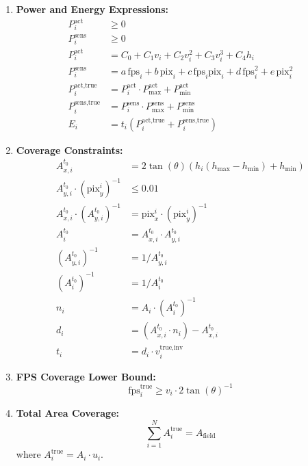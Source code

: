\begin{enumerate}
    \item \textbf{Power and Energy Expressions:}
    \begin{align}
        P^{\text{act}}_i &\geq 0 \\
        P^{\text{sens}}_i &\geq 0 \\
        P^{\text{act}}_i &= C_0 + C_1 v_i + C_2 v_i^2 + C_3 v_i^3 + C_4 h_i \\
        P^{\text{sens}}_i &= a\,\text{fps}_i + b\,\text{pix}_i + c\,\text{fps}_i \text{pix}_i + d\,\text{fps}_i^2 + e\,\text{pix}_i^2 \\
        P^{\text{act,true}}_i &= P^{\text{act}}_i \cdot P^{\text{act}}_{\max} + P^{\text{act}}_{\min} \\
        P^{\text{sens,true}}_i &= P^{\text{sens}}_i \cdot P^{\text{sens}}_{\max} + P^{\text{sens}}_{\min} \\
        E_i &= t_i (P^{\text{act,true}}_i + P^{\text{sens,true}}_i)
    \end{align}

    \item \textbf{Coverage Constraints:}
    \begin{align}
        A_{x,i}^{t_0} &= 2 \tan(\theta) (h_i (h_{\max} - h_{\min}) + h_{\min}) \\
        A_{y,i}^{t_0} \cdot (\text{pix}_y^i)^{-1} &\leq 0.01 \\
        A_{x,i}^{t_0} \cdot (A_{y,i}^{t_0})^{-1} &= \text{pix}_x^i \cdot (\text{pix}_y^i)^{-1} \\
        A_{i}^{t_0} &= A_{x,i}^{t_0} \cdot A_{y,i}^{t_0} \\
        (A_{y,i}^{t_0})^{-1} &= 1 / A_{y,i}^{t_0} \\
        (A_{i}^{t_0})^{-1} &= 1 / A_{i}^{t_0} \\
        n_i &= A_i \cdot (A_{i}^{t_0})^{-1} \\
        d_i &= (A_{x,i}^{t_0} \cdot n_i) - A_{x,i}^{t_0} \\
        t_i &= d_i \cdot v_i^{\text{true,inv}}
    \end{align}

    \item \textbf{FPS Coverage Lower Bound:}
    \begin{equation}
        \text{fps}_i^{\text{true}} \geq v_i \cdot 2 \tan(\theta)^{-1}
    \end{equation}

    \item \textbf{Total Area Coverage:}
    \begin{equation}
        \sum_{i=1}^{N} A_i^{\text{true}} = A_{\text{field}}
    \end{equation}
    where $A_i^{\text{true}} = A_i \cdot u_i$.


\end{enumerate}
